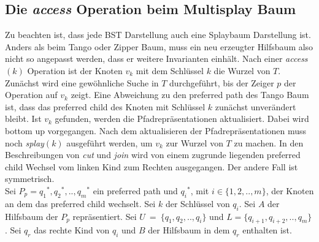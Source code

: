 \documentclass[a4paper,12pt]{article}
\begin{document}
 \subsection{Die \textit{access} Operation beim Multisplay Baum}
 Zu beachten ist, dass jede BST Darstellung auch eine Splaybaum Darstellung ist. Anders als beim Tango oder Zipper Baum, muss ein neu erzeugter Hilfsbaum also nicht so angepasst werden, dass er weitere Invarianten einhält.  Nach einer \textit{access}$\left(k\right)$ Operation ist der Knoten $v_k$ mit dem Schlüssel $k$ die Wurzel von $T$. Zunächst wird eine gewöhnliche Suche in $T$ durchgeführt, bis der Zeiger $p$ der Operation auf $v_k$ zeigt. Eine Abweichung zu den preferred path des Tango Baum ist, dass das preferred child des Knoten mit Schlüssel $k$ zunächst unverändert bleibt. Ist $v_k$ gefunden, werden die Pfadrepräsentationen aktualisiert. Dabei wird bottom up vorgegangen. Nach dem aktualisieren der Pfadrepräsentationen muss noch \textit{splay}$\left(k\right)$ ausgeführt werden, um $v_k$ zur Wurzel von $T$ zu machen. In den Beschreibungen von \textit{cut} und \textit{join} wird von einem zugrunde liegenden preferred child Wechsel vom linken Kind zum Rechten ausgegangen. Der andere Fall ist symmetrisch.\\ 
 \noindent Sei $P_p = {q_1}^*, {q_2}^*,.., {q_m}^*$ ein preferred path und ${q_i}^*$, mit $i \in \{1, 2,..,m\}$, der Knoten  an dem das preferred child wechselt. Sei $k$ der Schlüssel von $q_i$. Sei $A$ der Hilfsbaum der $P_p$ repräsentiert. Sei $U~=~\{q_1, q_2,.., q_i\}$  und $L= \{q_{i+1}, q_{i+2},..,q_m\}$.  Sei $q_r$ das rechte Kind von $q_i$ und $B$ der Hilfsbaum in dem $q_r$ enthalten ist.
 


 
\end{document}
